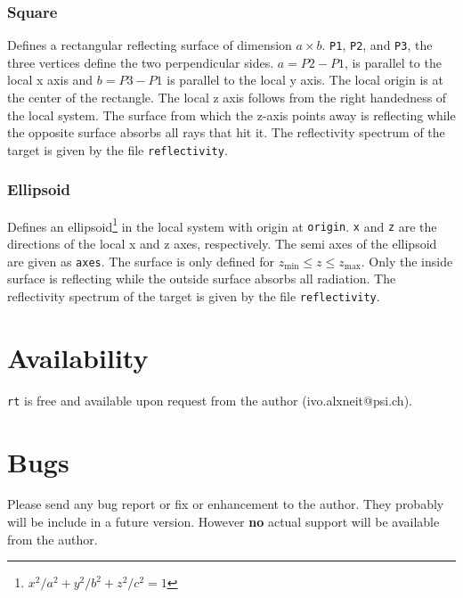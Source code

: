 \documentclass[10pt,a4paper,titlepage]{article}
\newcommand{\rt}{{\tt rt} }
\begin{document}
\subsubsection{Square}







Defines a rectangular reflecting surface of dimension $a \times b$. {\tt P1}, {\tt P2}, and {\tt P3}, the three vertices define the two perpendicular sides. $a=P2-P1$, is parallel to the local x axis and $b=P3 - P1$ is parallel to the local y axis. The local origin is at the center of the rectangle. The local z axis follows from the right handedness of the local system. The surface from which the z-axis points away is reflecting while the opposite surface absorbs all rays that hit it. The reflectivity spectrum of the target is given by the file {\tt reflectivity}.

\subsubsection{Ellipsoid}










Defines an ellipsoid\footnote{${x^2}/{a^2}+{y^2}/{b^2}+{z^2}/{c^2}=1$} in the local system with origin at {\tt origin}. {\tt x} and {\tt z} are the directions of the local x and z axes, respectively. The semi axes of the ellipsoid are given as {\tt axes}. The surface is only defined for $z_\mathrm{min} \leq z \leq z_\mathrm{max}$. Only the inside surface is reflecting while the outside surface absorbs all radiation. The reflectivity spectrum of the target is given by the file {\tt reflectivity}.


\section{Availability}
\rt is free and available upon request from the author (ivo.alxneit@psi.ch).



\section{Bugs} Please send any bug report or fix or enhancement to the author. They probably will be include in a future version. However {\bf no} actual support will be available from the author.
\end{document}
